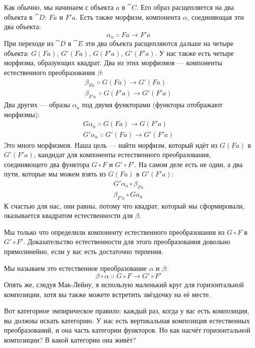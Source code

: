 \noindent
Как обычно, мы начинаем с объекта $a$ в $\cat{C}$. Его образ расщепляется на
два объекта в $\cat{D}$: $F a$ и $F'a$. Есть также
морфизм, компонента $\alpha$, соединяющая эти два объекта:
\[\alpha_a \Colon F a \to F'a\]
При переходе из $\cat{D}$ в $\cat{E}$ эти два объекта расщепляются дальше на четыре
объекта: $G (F a)$, $G'(F a)$, $G (F'a)$, $G'(F'a)$.
У нас также есть четыре морфизма, образующих квадрат. Два из этих морфизмов ---
компоненты естественного преобразования $\beta$:
\begin{gather*}
  \beta_{F a} \Colon G (F a) \to G'(F a) \\
  \beta_{F'a} \Colon G (F'a) \to G'(F'a)
\end{gather*}
Два других --- образы $\alpha_a$ под двумя
функторами (функторы отображают морфизмы):
\begin{gather*}
  G \alpha_a \Colon G (F a) \to G (F'a) \\
  G'\alpha_a \Colon G'(F a) \to G'(F'a)
\end{gather*}
Это много морфизмов. Наша цель --- найти морфизм, который идёт из
$G (F a)$ в $G'(F'a)$, кандидат для
компоненты естественного преобразования, соединяющего два функтора $G \circ F$
и $G' \circ F'$. На самом деле есть не один, а два пути, которые мы можем взять из
$G (F a)$ в $G'(F'a)$:
\begin{gather*}
  G'\alpha_a \circ \beta_{F a} \\
  \beta_{F'a} \circ G \alpha_a
\end{gather*}
К счастью для нас, они равны, потому что квадрат, который мы сформировали, оказывается
квадратом естественности для $\beta$.

Мы только что определили компоненту естественного преобразования из $G \circ F$
в $G' \circ F'$. Доказательство естественности для этого преобразования довольно
прямолинейно, если у вас есть достаточно терпения.

Мы называем это естественное преобразование 
$\alpha$ и $\beta$:
\[\beta \circ \alpha \Colon G \circ F \to G' \circ F'\]
Опять же, следуя Мак-Лейну, я использую маленький круг для горизонтальной
композиции, хотя вы также можете встретить звёздочку на её месте.

Вот категорное эмпирическое правило: каждый раз, когда у вас есть композиция, вы
должны искать категорию. У нас есть вертикальная композиция естественных
преобразований, и она часть категории функторов. Но как насчёт
горизонтальной композиции? В какой категории она живёт?

